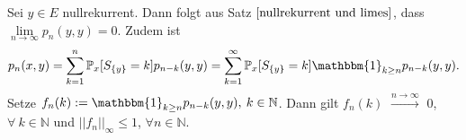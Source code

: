 Sei $y \in E$ nullrekurrent. Dann folgt aus Satz $\ref{nullrekurrent und limes}$, dass $\lim \limits_{ n \to \infty} p_{n}(y,y) = 0$. Zudem ist 
\begin{equation*}
p_{n}(x,y) = \sum_{k=1}^{n} \mathbb{P}_{x}[S_{\lbrace y \rbrace} = k] p_{n-k}(y,y) = \sum_{k=1}^{\infty} \mathbb{P}_{x}[S_{\lbrace y \rbrace} = k] \mathbbm{1}_{k \geq n} p_{n-k}(y,y).
\end{equation*}
Setze $f_{n}(k) := \mathbbm{1}_{k \geq n} p_{n-k}(y,y), \: k \in \mathbb{N}$. Dann gilt $f_{n}(k)$ $\stackrel{n \to \infty}{\to}$ 0, $\forall \: k \in \mathbb{N}$ und $\vert \vert f_{n} \vert \vert_{\infty} \leq 1$, $\forall n \in \mathbb{N}$.